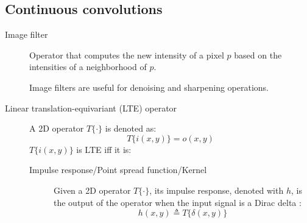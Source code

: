 \subsection{Continuous convolutions}

\begin{description}
    \item[Image filter] 
        Operator that computes the new intensity of a pixel $p$ based on the intensities of a neighborhood of $p$.

        \begin{remark}
            Image filters are useful for denoising and sharpening operations.
        \end{remark}

    \item[Linear translation-equivariant (LTE) operator] 
        A 2D operator $T\{ \cdot \}$ is denoted as:
        \[ T\{ i(x, y) \} = o(x, y) \] 
        $T\{ i(x, y) \}$ is LTE iff it is:

        \begin{description}
            \item[Impulse response/Point spread function/Kernel] 
                Given a 2D operator $T\{ \cdot \}$, 
                its impulse response, denoted with $h$, is the output of the operator when the input signal is a Dirac delta \cite{slides:filters}:
                \[ h(x, y) \triangleq T\{ \delta(x, y) \} \]
        \end{description}
\end{description}


